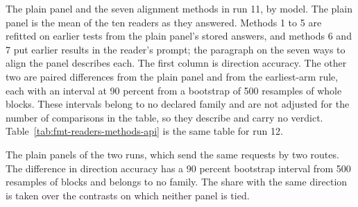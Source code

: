 \begin{table}[t]\centering\footnotesize
\caption{The plain panel and the seven alignment methods in run 11, by model. The plain panel is the mean of the ten readers as they answered. Methods 1 to 5 are refitted on earlier tests from the plain panel's stored answers, and methods 6 and 7 put earlier results in the reader's prompt; the paragraph on the seven ways to align the panel describes each. The first column is direction accuracy. The other two are paired differences from the plain panel and from the earliest-arm rule, each with an interval at 90 percent from a bootstrap of 500 resamples of whole blocks. These intervals belong to no declared family and are not adjusted for the number of comparisons in the table, so they describe and carry no verdict. Table~\ref{tab:fmt-readers-methods-api} is the same table for run 12.}
\label{tab:fmt-readers-methods}

\end{table}

\begin{table}[t]\centering\footnotesize
\caption{The plain panels of the two runs, which send the same requests by two routes. The difference in direction accuracy has a 90 percent bootstrap interval from 500 resamples of blocks and belongs to no family. The share with the same direction is taken over the contrasts on which neither panel is tied.}
\label{tab:fmt-readers-transport}
\resizebox{\columnwidth}{!}{}
\end{table}

